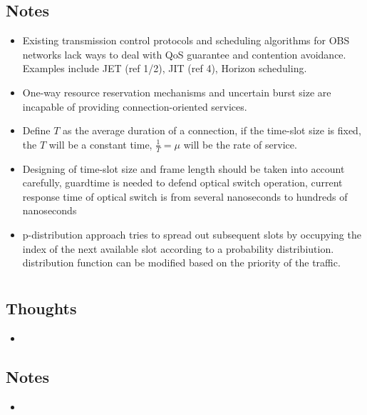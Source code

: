 \documentclass{article}
\begin{document}
\subsection{Notes}
\begin{itemize}
    \item Existing transmission control protocols and scheduling algorithms for OBS networks lack ways to deal with QoS guarantee and contention avoidance.  Examples include JET (ref 1/2), JIT (ref 4), Horizon scheduling.
    \item One-way resource reservation mechanisms and uncertain burst size are incapable of providing connection-oriented services.
    \item Define $T$ as the average duration of a connection, if the time-slot size is fixed, the $T$ will be a constant time, $\frac{1}{T}=\mu$ will be the rate of service.
    \item Designing of time-slot size and frame length should be taken into account carefully, guardtime is needed to defend optical switch operation, current response time of optical switch is from several nanoseconds to hundreds of nanoseconds
    \item p-distribution approach tries to spread out subsequent slots by occupying the index of the next available slot according to a probability distribiution.  distribution function can be modified based on the priority of the traffic.
\end{itemize}


    \section{}


\subsection{Thoughts}
\begin{itemize}
    \item
\end{itemize}

\subsection{Notes}
\begin{itemize}
    \item
\end{itemize}


    \section{}
\end{document}
